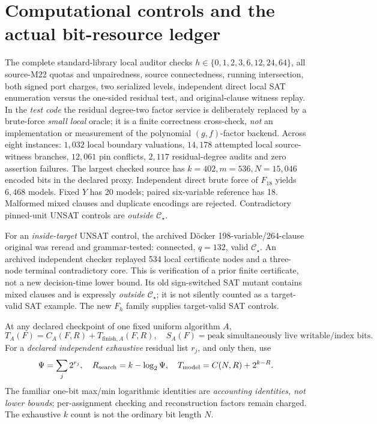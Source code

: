 \documentclass[11pt]{article}
\newcommand{\CS}{\mathcal C_{\star}}
\begin{document}
\section{Computational controls and the actual bit-resource ledger}
The complete standard-library local auditor checks \(h\in\{0,1,2,3,6,12,24,64\}\), all source-M22 quotas and unpairedness, source connectedness, running intersection, both signed port charges, two serialized levels, independent direct local SAT enumeration versus the one-sided residual test, and original-clause witness replay. In the \emph{test code} the residual degree-two factor service is deliberately replaced by a brute-force \emph{small local} oracle; it is a finite correctness cross-check, \emph{not} an implementation or measurement of the polynomial \((g,f)\)-factor backend. Across eight instances: \(1{,}032\) local boundary valuations, \(14{,}178\) attempted local source-witness branches, \(12{,}061\) pin conflicts, \(2{,}117\) residual-degree audits and zero assertion failures. The largest checked source has \(k=402,m=536,N=15{,}046\) encoded bits in the declared proxy. Independent direct brute force of \(F_{18}\) yields \(6{,}468\) models. Fixed \(Y\) has 20 models; paired six-variable reference has 18. Malformed mixed clauses and duplicate encodings are rejected. Contradictory pinned-unit UNSAT controls are \emph{outside \(\CS\)}.

For an \emph{inside-target} UNSAT control, the archived D\"ocker 198-variable/264-clause original was reread and grammar-tested: connected, \(q=132\), valid \(\CS\). An archived independent checker replayed 534 local certificate nodes and a three-node terminal contradictory core. This is verification of a prior finite certificate, not a new decision-time lower bound. Its old sign-switched SAT mutant contains mixed clauses and is expressly \emph{outside \(\CS\)}; it is not silently counted as a target-valid SAT example. The new \(F_h\) family supplies target-valid SAT controls.

At any declared checkpoint of one fixed uniform algorithm \(A\),
\[
 T_A(F)=C_A(F,R)+T_{\mathrm{finish},A}(F,R),\quad
 S_A(F)=\text{peak simultaneously live writable/index bits}.
\]
For a \emph{declared independent exhaustive} residual list \(r_j\), and only then, use
\[
 \Psi=\sum_j2^{r_j},\quad R_{\rm search}=k-\log_2\Psi,\quad
 T_{\rm model}=C(N,R)+2^{k-R}.
\]
The familiar one-bit max/min logarithmic identities are \emph{accounting identities, not lower bounds}; per-assignment checking and reconstruction factors remain charged. The exhaustive \(k\) count is not the ordinary bit length \(N\).
\end{document}

